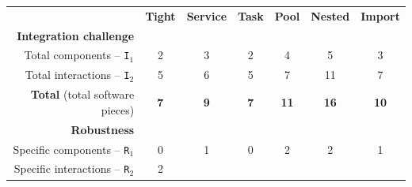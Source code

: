 \documentclass[preprint,3p,twocolumn]{elsarticle}
\begin{document}
\begin{table}
\footnotesize
\centering
\begin{tabular}{rcccccc}
                                     & \textbf{Tight}
                                     & \textbf{Service}
                                     & \textbf{Task}
                                     & \textbf{Pool}
                                     & \textbf{Nested}
                                     & \textbf{Import} \\
\cellcolor[HTML]{EEEEEE}\textbf{Integration challenge}& \multicolumn{6}{l}{\cellcolor[HTML]{EEEEEE}}\\
  Total components -- \texttt{I$_1$} & \cellcolor[HTML]{99FF99}2
                                     & \cellcolor[HTML]{99DD99}3
                                     & \cellcolor[HTML]{99FF99}2
                                     & \cellcolor[HTML]{99BB99}4
                                     & \cellcolor[HTML]{999999}5
                                     & \cellcolor[HTML]{99DD99}3\\
Total interactions -- \texttt{I$_2$} & \cellcolor[HTML]{99FF99}5
                                     & \cellcolor[HTML]{99EE99}6
                                     & \cellcolor[HTML]{99FF99}5
                                     & \cellcolor[HTML]{99DD99}7
                                     & \cellcolor[HTML]{999999}11
                                     & \cellcolor[HTML]{99DD99}7\\
\textbf{Total} (total software pieces) & \cellcolor[HTML]{99FF99}\textbf{7}
                                     & \cellcolor[HTML]{99E899}\textbf{9}
                                     & \cellcolor[HTML]{99FF99}\textbf{7}
                                     & \cellcolor[HTML]{99D199}\textbf{11}
                                     & \cellcolor[HTML]{999999}\textbf{16}
                                     & \cellcolor[HTML]{99DD99}\textbf{10}\\
\cellcolor[HTML]{EEEEEE}\textbf{Robustness}& \multicolumn{6}{l}{\cellcolor[HTML]{EEEEEE}}\\
Specific components -- \texttt{R$_1$} & \cellcolor[HTML]{99FF99}0
                                     & \cellcolor[HTML]{99CC99}1
                                     & \cellcolor[HTML]{99FF99}0
                                     & \cellcolor[HTML]{999999}2
                                     & \cellcolor[HTML]{999999}2
                                     & \cellcolor[HTML]{99CC99}1\\
  Specific interactions -- \texttt{R$_2$} & \cellcolor[HTML]{99EA99}2

\end{tabular}
\end{table}
\end{document}
